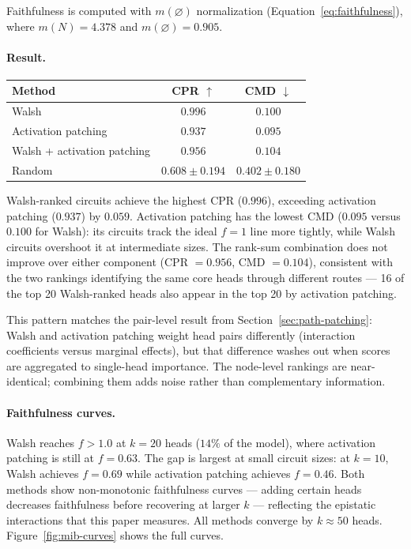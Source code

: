 \documentclass{article}
\begin{document}
Faithfulness is computed with $m(\varnothing)$ normalization
(Equation~\ref{eq:faithfulness}), where $m(N) = 4.378$ and
$m(\varnothing) = 0.905$.

\paragraph{Result.}

\medskip

\begin{tabular}{lcc}
\toprule
Method & CPR $\uparrow$ & CMD $\downarrow$ \\
\midrule
Walsh                              & $0.996$ & $0.100$ \\
Activation patching                & $0.937$ & $0.095$ \\
Walsh + activation patching        & $0.956$ & $0.104$ \\
Random                             & $0.608 \pm 0.194$ & $0.402 \pm 0.180$ \\
\bottomrule
\end{tabular}

\medskip

Walsh-ranked circuits achieve the highest CPR ($0.996$), exceeding
activation patching ($0.937$) by $0.059$. Activation patching has
the lowest CMD ($0.095$ versus $0.100$ for Walsh): its circuits
track the ideal $f = 1$ line more tightly, while Walsh circuits
overshoot it at intermediate sizes. The rank-sum combination does not
improve over either component (CPR $= 0.956$, CMD $= 0.104$),
consistent with the two rankings identifying the same core heads
through different routes --- 16 of the top 20 Walsh-ranked heads also
appear in the top 20 by activation patching.

This pattern matches the pair-level result from
Section~\ref{sec:path-patching}: Walsh and activation patching weight
head pairs differently (interaction coefficients versus marginal
effects), but that difference washes out when scores are aggregated to
single-head importance. The node-level rankings are near-identical;
combining them adds noise rather than complementary information.

\paragraph{Faithfulness curves.}

Walsh reaches $f > 1.0$ at $k = 20$ heads ($14\%$ of the model),
where activation patching is still at $f = 0.63$.
The gap is largest at small circuit sizes: at $k = 10$, Walsh achieves
$f = 0.69$ while activation patching achieves $f = 0.46$.
Both methods show non-monotonic faithfulness curves --- adding certain
heads decreases faithfulness before recovering at larger $k$ ---
reflecting the epistatic interactions that this paper measures.
All methods converge by $k \approx 50$ heads.
Figure~\ref{fig:mib-curves} shows the full curves.
\end{document}
